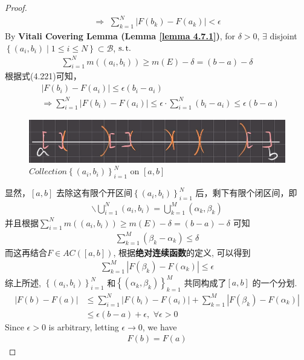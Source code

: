 \begin{thm}
\begin{proof}
\begin{align}
				\Rightarrow \,\, \sum_{k = 1}^{N}{\left| F(b_k) - F(a_k) \right|} < \epsilon
			\end{align}
			By \textbf{Vitali Covering Lemma (Lemma \ref{lemma 4.7.1})}, for $\delta > 0$, $\exists$ disjoint $\left\{ (a_i , b_i) \mid 1 \leq i \leq N \right\} \subset \mathcal{B}$, $\operatorname{s.t.}$
			\begin{align}
				\sum_{i = 1}^{N}{m\left( (a_i , b_i) \right)} \geq m(E) - \delta = (b - a) - \delta
			\end{align}
			根据式(4.221)可知，
			\begin{align}
				&\left| F(b_i) - F(a_i) \right| \leq \epsilon (b_i - a_i) \\
				&\Rightarrow \sum_{i = 1}^{N}{\left| F(b_i) - F(a_i) \right|} 
				\leq \epsilon \cdot \sum_{i = 1}^{N}{(b_i - a_i)} 
				\leq \epsilon (b - a)
			\end{align}
			
			\begin{figure}[thbp!]
				\centering
				\includegraphics[width=0.4\linewidth]{figure/4.7.3-1}
				\caption{$Collection \left\{ (a_i , b_i) \right\}_{i = 1}^{N}$ on $[a , b]$}
				\label{pic : 4.7.3-1} %
			\end{figure}
			
			显然，$[a , b]$ 去除这有限个开区间$\left\{ (a_i , b_i) \right\}_{i = 1}^{N}$ 后，剩下有限个闭区间，即
			\begin{align}
				[a , b] \backslash \bigcup_{i = 1}^{N}{(a_i , b_i)} = \bigcup_{k = 1}^{M}{(\alpha_k , \beta_k)}
			\end{align}
			并且根据$\sum_{i = 1}^{N}{m\left( (a_i , b_i) \right)} \geq m(E) - \delta = (b - a) - \delta$ 可知
			\begin{align}
				\sum_{k = 1}^{M}{(\beta_k - \alpha_k)} \leq \delta
			\end{align}
			而这再结合$F \in AC([a , b])$, 根据\textbf{绝对连续函数}的定义, 可以得到
			\begin{align}
				\sum_{k = 1}^{M}{\left| F(\beta_k) - F(\alpha_k) \right|} \leq \epsilon
			\end{align}
			综上所述, $\left\{ (a_i , b_i) \right\}_{i = 1}^N$ 和$\left\{ (\alpha_k , \beta_k) \right\}_{k = 1}^M$ 共同构成了$[a , b]$ 的一个分划.
			\begin{align}
				\left| F(b) - F(a) \right| 
				&\leq \sum_{i = 1}^{N}{\left| F(b_i) - F(a_i) \right|} + \sum_{k = 1}^{M}{\left| F(\beta_k) - F(\alpha_k) \right|} \\
				&\leq \epsilon (b - a) + \epsilon , \,\, \forall \epsilon > 0
 			\end{align}
 			Since $\epsilon > 0$ is arbitrary, letting $\epsilon \to 0$, we have
 			\begin{align}
 				F(b) = F(a)
 			\end{align}
		\end{proof}
	\end{thm}

